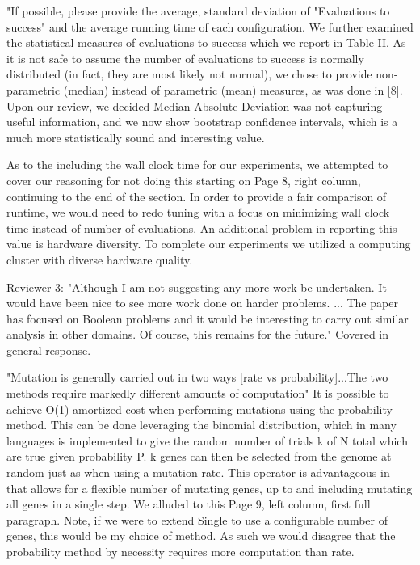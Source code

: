 \documentclass{letter}
\begin{document}
\begin{letter}{}
"If possible, please provide the average, standard deviation of "Evaluations to success" and the average running time of each configuration.
We further examined the statistical measures
of evaluations to success which we report in Table II.  As it is not safe to assume the number
of evaluations to success is normally distributed (in fact, they are most likely not normal),
we chose to provide non-parametric (median) instead of parametric (mean) measures,
as was done in [8].  Upon our review, we decided Median Absolute Deviation was not
capturing useful information, and we now show bootstrap confidence intervals, which is a much
more statistically sound and interesting value.

As to the including the wall clock time for our experiments, we attempted to cover our
reasoning for not doing this starting on Page 8, right column, continuing to the end of the section.
In order to provide a fair comparison of runtime, we would need to redo tuning
with a focus on minimizing wall clock time instead of number of evaluations.
An additional
problem in reporting this value is hardware diversity.  To complete our experiments
we utilized a computing cluster with diverse hardware quality.


Reviewer 3:
"Although I am not suggesting any more work be undertaken. It would have been nice
to see more work done on harder problems. ... The paper has focused on Boolean problems and it would be interesting to
carry out similar analysis in other domains. Of course, this remains for the future."
Covered in general response.

"Mutation is generally carried out in two ways [rate vs probability]...The two methods require markedly different amounts of computation"
It is possible to achieve O(1) amortized cost when performing mutations using the probability method.
This can be done leveraging the binomial distribution, which in many languages is implemented to give
the random number of trials k of N total which are true given probability P.  k genes can then
be selected from the genome at random just as when using a mutation rate.  This operator is
advantageous in that allows for a flexible number of mutating genes, up to and including
mutating all genes in a single step.  We alluded to this Page 9, left column, first full paragraph.
Note, if we were to extend Single to use a configurable
number of genes, this would be my choice of method.  As such we would disagree that the probability method
by necessity requires more computation than rate.


\end{letter}
\end{document}
